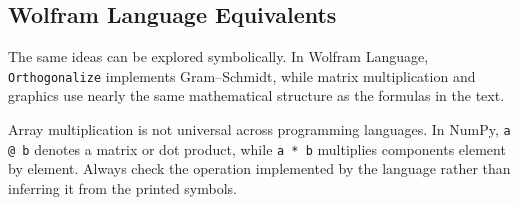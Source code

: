 \subsection{Wolfram Language Equivalents}
The same ideas can be explored symbolically. In Wolfram Language, \texttt{Orthogonalize} implements Gram--Schmidt, while matrix multiplication and graphics use nearly the same mathematical structure as the formulas in the text.



\begin{mistakebox}
Array multiplication is not universal across programming languages. In NumPy, \texttt{a @ b} denotes a matrix or dot product, while \texttt{a * b} multiplies components element by element. Always check the operation implemented by the language rather than inferring it from the printed symbols.
\end{mistakebox}
